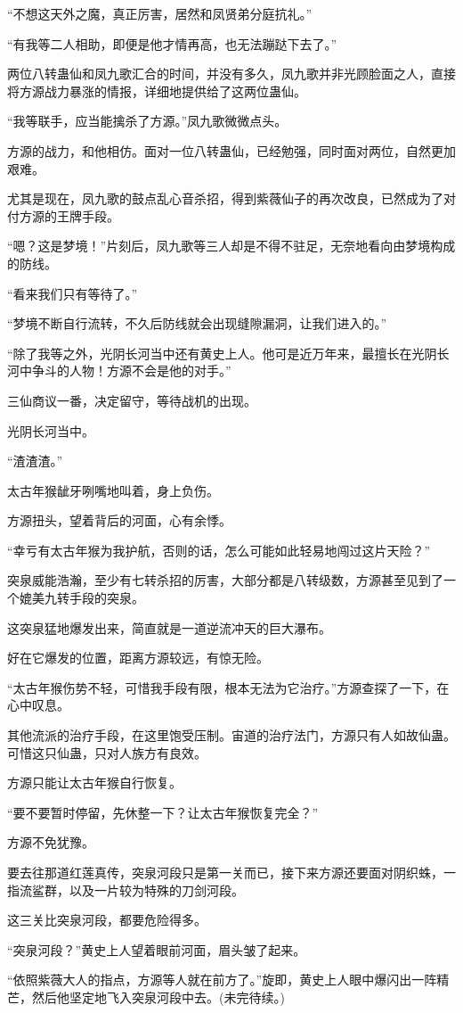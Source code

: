 \begin{this_body}
“不想这天外之魔，真正厉害，居然和凤贤弟分庭抗礼。”

“有我等二人相助，即便是他才情再高，也无法蹦跶下去了。”

两位八转蛊仙和凤九歌汇合的时间，并没有多久，凤九歌并非光顾脸面之人，直接将方源战力暴涨的情报，详细地提供给了这两位蛊仙。

“我等联手，应当能擒杀了方源。”凤九歌微微点头。

方源的战力，和他相仿。面对一位八转蛊仙，已经勉强，同时面对两位，自然更加艰难。

尤其是现在，凤九歌的鼓点乱心音杀招，得到紫薇仙子的再次改良，已然成为了对付方源的王牌手段。

“嗯？这是梦境！”片刻后，凤九歌等三人却是不得不驻足，无奈地看向由梦境构成的防线。

“看来我们只有等待了。”

“梦境不断自行流转，不久后防线就会出现缝隙漏洞，让我们进入的。”

“除了我等之外，光阴长河当中还有黄史上人。他可是近万年来，最擅长在光阴长河中争斗的人物！方源不会是他的对手。”

三仙商议一番，决定留守，等待战机的出现。

光阴长河当中。

“渣渣渣。”

太古年猴龇牙咧嘴地叫着，身上负伤。

方源扭头，望着背后的河面，心有余悸。

“幸亏有太古年猴为我护航，否则的话，怎么可能如此轻易地闯过这片天险？”

突泉威能浩瀚，至少有七转杀招的厉害，大部分都是八转级数，方源甚至见到了一个媲美九转手段的突泉。

这突泉猛地爆发出来，简直就是一道逆流冲天的巨大瀑布。

好在它爆发的位置，距离方源较远，有惊无险。

“太古年猴伤势不轻，可惜我手段有限，根本无法为它治疗。”方源查探了一下，在心中叹息。

其他流派的治疗手段，在这里饱受压制。宙道的治疗法门，方源只有人如故仙蛊。可惜这只仙蛊，只对人族方有良效。

方源只能让太古年猴自行恢复。

“要不要暂时停留，先休整一下？让太古年猴恢复完全？”

方源不免犹豫。

要去往那道红莲真传，突泉河段只是第一关而已，接下来方源还要面对阴织蛛，一指流鲨群，以及一片较为特殊的刀剑河段。

这三关比突泉河段，都要危险得多。

“突泉河段？”黄史上人望着眼前河面，眉头皱了起来。

“依照紫薇大人的指点，方源等人就在前方了。”旋即，黄史上人眼中爆闪出一阵精芒，然后他坚定地飞入突泉河段中去。(未完待续。)

\end{this_body}

